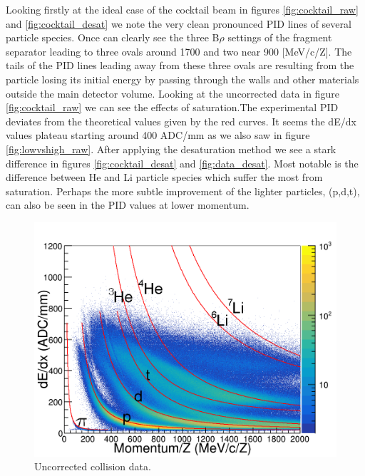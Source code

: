 \documentclass[review]{elsarticle}
\begin{document}
Looking firstly at the ideal case of the cocktail beam in figures \ref{fig:cocktail_raw} and \ref{fig:cocktail_desat} we note the very clean pronounced PID lines of several particle species. Once can clearly see the three  B$\rho$ settings of the fragment separator leading to three ovals around 1700 and two near 900 [MeV/c/Z]. The tails of the PID lines leading away from these three ovals are resulting from the particle losing its initial energy by passing through the walls and other materials outside the main detector volume. Looking at the uncorrected data in figure \ref{fig:cocktail_raw} we can see the effects of saturation.The experimental PID deviates from the theoretical values given by the red curves. It seems the dE/dx values plateau starting around 400 ADC/mm as we also saw in figure \ref{fig:lowvshigh_raw}.  After applying the desaturation method we see a stark difference in figures \ref{fig:cocktail_desat} and \ref{fig:data_desat}. Most notable is the difference between He and Li particle species which suffer the most from saturation. Perhaps the more subtle improvement of the lighter particles, (p,d,t), can also be seen in the PID values at lower momentum.

 

\begin{figure}[ht]
\includegraphics[width=\linewidth]{data_raw}
\caption{Uncorrected collision data.}
\label{fig:data_raw}
\end{figure}
\end{document}
